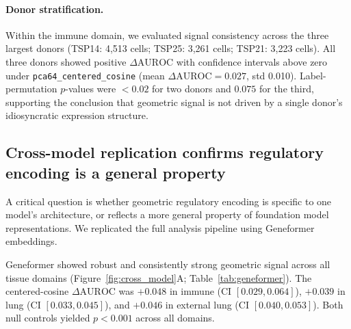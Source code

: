 \documentclass[11pt]{article}
\newcommand{\DAURC}{\Delta\mathrm{AUROC}}
\begin{document}
\paragraph{Donor stratification.}
Within the immune domain, we evaluated signal consistency across the three largest donors (TSP14: 4,513 cells; TSP25: 3,261 cells; TSP21: 3,223 cells).
All three donors showed positive $\DAURC$ with confidence intervals above zero under \texttt{pca64\_centered\_cosine} (mean $\DAURC = 0.027$, std 0.010).
Label-permutation $p$-values were $<0.02$ for two donors and $0.075$ for the third, supporting the conclusion that geometric signal is not driven by a single donor's idiosyncratic expression structure.

\subsection*{Cross-model replication confirms regulatory encoding is a general property}

A critical question is whether geometric regulatory encoding is specific to one model's architecture, or reflects a more general property of foundation model representations.
We replicated the full analysis pipeline using Geneformer embeddings.

Geneformer showed robust and consistently strong geometric signal across all tissue domains (Figure~\ref{fig:cross_model}A; Table~\ref{tab:geneformer}).
The centered-cosine $\DAURC$ was $+0.048$ in immune (CI $[0.029, 0.064]$), $+0.039$ in lung (CI $[0.033, 0.045]$), and $+0.046$ in external lung (CI $[0.040, 0.053]$).
Both null controls yielded $p < 0.001$ across all domains.
\end{document}
